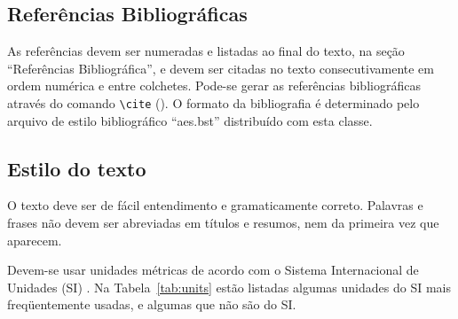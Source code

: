 \documentclass
  [ams,pdfout]%
	{aesbr}
\begin{document}
\subsection{Referências Bibliográficas}

As referências devem ser numeradas e listadas ao final do texto, na seção ``Referências Bibliográfica'', e devem ser citadas no texto consecutivamente em ordem numérica e entre colchetes.
Pode-se gerar as referências bibliográficas através do comando \verb|\cite| (\cite{Lam94,ClarkAF}). O formato da bibliografia é determinado pelo arquivo de estilo bibliográfico ``aes.bst'' distribuído com esta classe.
%
\subsection{Estilo do texto}
O texto deve ser de fácil entendimento e gramaticamente correto. Palavras e frases não devem ser abreviadas em títulos e resumos, nem da primeira vez que aparecem.

Devem-se usar unidades métricas de acordo com o Sistema Internacional de Unidades (SI) \cite{Inmetro12}. Na Tabela~\ref{tab:units} estão listadas algumas unidades do SI mais freqüentemente usadas, e algumas que não são do SI.
\end{document}
